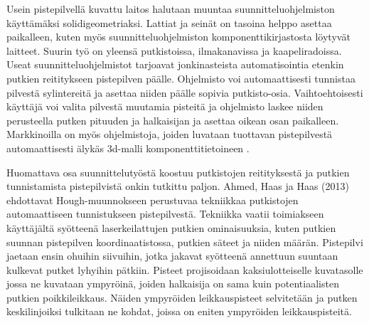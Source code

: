 

Usein pistepilvellä kuvattu laitos halutaan muuntaa suunnitteluohjelmiston käyttämäksi solidigeometriaksi. Lattiat ja seinät on tasoina helppo asettaa paikalleen, kuten myös suunnitteluohjelmiston komponenttikirjastosta löytyvät laitteet. Suurin työ on yleensä putkistoissa, ilmakanavissa ja kaapeliradoissa. Useat suunnitteluohjelmistot tarjoavat jonkinasteista automatisointia etenkin putkien reititykseen pistepilven päälle. Ohjelmisto voi automaattisesti tunnistaa pilvestä sylintereitä ja asettaa niiden päälle sopivia putkisto-osia. Vaihtoehtoisesti käyttäjä voi valita pilvestä muutamia pisteitä ja ohjelmisto laskee niiden perusteella putken pituuden ja halkaisijan ja asettaa oikean osan paikalleen. Markkinoilla on myös ohjelmistoja, joiden luvataan tuottavan pistepilvestä automaattisesti älykäs 3d-malli komponenttitietoineen \cite{aveva}. 

Huomattava osa suunnittelutyöstä koostuu putkistojen reitityksestä ja putkien tunnistamista pistepilvistä onkin tutkittu paljon. Ahmed, Haas ja Haas (2013) ehdottavat Hough-muunnokseen  perustuvaa tekniikkaa putkistojen automaattiseen tunnistukseen pistepilvestä. Tekniikka vaatii toimiakseen käyttäjältä syötteenä laserkeilattujen putkien ominaisuuksia, kuten putkien suunnan pistepilven koordinaatistossa, putkien säteet ja niiden määrän. Pistepilvi jaetaan ensin ohuihin siivuihin, jotka jakavat syötteenä annettuun suuntaan kulkevat putket lyhyihin pätkiin. Pisteet projisoidaan kaksiulotteiselle kuvatasolle jossa ne kuvataan ympyröinä, joiden halkaisija on sama kuin potentiaalisten putkien poikkileikkaus. Näiden ympyröiden leikkauspisteet selvitetään ja putken keskilinjoiksi tulkitaan ne kohdat, joissa on eniten ympyröiden leikkauspisteitä. \cite{ahmed}


